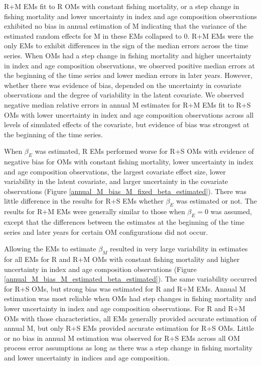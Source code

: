 \documentclass[
  12pt,
]{article}
\begin{document}
R+M EMs fit to R OMs with constant fishing mortality, or a step change in fishing mortality and lower uncertainty in index and age composition observations exhibited no bias in annual estimation of M indicating that the variance of the estimated random effects for M in these EMs collapsed to 0. R+M EMs were the only EMs to exhibit differences in the sign of the median errors across the time series. When OMs had a step change in fishing mortality and higher uncertainty in index and age composition observations, we observed positive median errors at the beginning of the time series and lower median errors in later years. However, whether there was evidence of bias, depended on the uncertainty in covariate observations and the degree of variability in the latent covariate. We observed negative median relative errors in annual M estimates for R+M EMs fit to R+S OMs with lower uncertainty in index and age composition observations across all levels of simulated effects of the covariate, but evidence of bias was strongest at the beginning of the time series.

When \(\beta_E\) was estimated, R EMs performed worse for R+S OMs with evidence of negative bias for OMs with constant fishing mortality, lower uncertainty in index and age composition observations, the largest covariate effect size, lower variability in the latent covariate, and larger uncertainty in the covariate observations (Figure \ref{annual_M_bias_M_fixed_beta_estimated}). There was little difference in the results for R+S EMs whether \(\beta_E\) was estimated or not. The results for R+M EMs were generally similar to those when \(\beta_E=0\) was assumed, except that the differences between the estimates at the beginning of the time series and later years for certain OM configurations did not occur.

Allowing the EMs to estimate \(\beta_M\) resulted in very large variability in estimates for all EMs for R and R+M OMs with constant fishing mortality and higher uncertainty in index and age composition observations (Figure \ref{annual_M_bias_M_estimated_beta_estimated}). The same variability occurred for R+S OMs, but strong bias was estimated for R and R+M EMs. Annual M estimation was most reliable when OMs had step changes in fishing mortality and lower uncertainty in index and age composition observations. For R and R+M OMs with those characteristics, all EMs generally provided accurate estimation of annual M, but only R+S EMs provided accurate estimation for R+S OMs. Little or no bias in annual M estimation was observed for R+S EMs across all OM process error assumptions as long as there was a step change in fishing mortality and lower uncertainty in indices and age composition.
\end{document}
